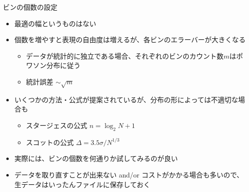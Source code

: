 \begin{frame}[t,fragile]{ビンの個数の設定}
  \begin{itemize}
  \item 最適の幅というものはない
  \item 個数を増やすと表現の自由度は増えるが、各ビンのエラーバーが大きくなる
    \begin{itemize}
    \item データが統計的に独立である場合、それぞれのビンのカウント数$m$はポワソン分布に従う
    \item 統計誤差 $\sim \sqrt{m}$
    \end{itemize}
  \item いくつかの方法・公式が提案されているが、分布の形によっては不適切な場合も
    \begin{itemize}
    \item スタージェスの公式 $n = \log_2 N + 1$
    \item スコットの公式 $\Delta = 3.5 \sigma / N^{1/3}$
    \end{itemize}
  \item 実際には、ビンの個数を何通りか試してみるのが良い
  \item データを取り直すことが出来ない and/or コストがかかる場合も多いので、生データはいったんファイルに保存しておく
  \end{itemize}
\end{frame}
